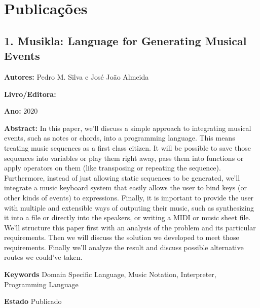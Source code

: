 \chapter{Publicações}

\section{1. Musikla: Language for Generating Musical Events}

{
\setlength{\parindent}{0cm}
\textbf{Autores:} Pedro M. Silva e José João Almeida

\textbf{Livro/Editora:}

\textbf{Ano:} 2020

\textbf{Abstract:} In this paper, we'll discuss a simple approach to integrating musical events, such as notes or chords, into a programming language. This means treating music sequences as a first class citizen. It will be possible to save those sequences into variables or play them right away, pass them into functions or apply operators on them (like transposing or repeating the sequence). Furthermore, instead of just allowing static sequences to be generated, we'll integrate a music keyboard system that easily allows the user to bind keys (or other kinds of events) to expressions. Finally, it is important to provide the user with multiple and extensible ways of outputing their music, such as synthesizing it into a file or directly into the speakers, or writing a MIDI or music sheet file. We'll structure this paper first with an analysis of the problem and its particular requirements. Then we will discuss the solution we developed to meet those requirements. Finally we'll analyze the result and discuss possible alternative routes we could've taken.

\textbf{Keywords} Domain Specific Language, Music Notation, Interpreter, Programming Language

\textbf{Estado} Publicado
}
